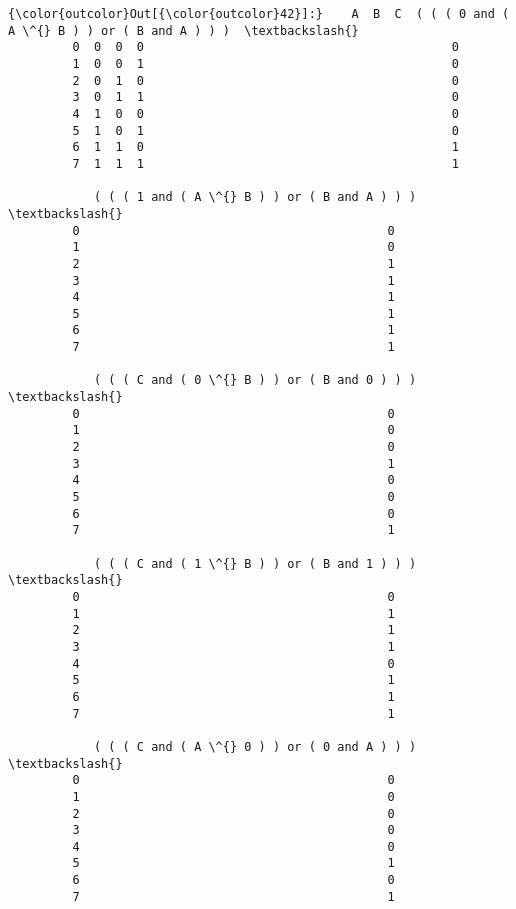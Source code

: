 \documentclass[11pt]{article}
\begin{document}
\begin{Verbatim}[commandchars=\\\{\}]
{\color{outcolor}Out[{\color{outcolor}42}]:}    A  B  C  ( ( ( 0 and ( A \^{} B ) ) or ( B and A ) ) )  \textbackslash{}
         0  0  0  0                                           0   
         1  0  0  1                                           0   
         2  0  1  0                                           0   
         3  0  1  1                                           0   
         4  1  0  0                                           0   
         5  1  0  1                                           0   
         6  1  1  0                                           1   
         7  1  1  1                                           1   
         
            ( ( ( 1 and ( A \^{} B ) ) or ( B and A ) ) )  \textbackslash{}
         0                                           0   
         1                                           0   
         2                                           1   
         3                                           1   
         4                                           1   
         5                                           1   
         6                                           1   
         7                                           1   
         
            ( ( ( C and ( 0 \^{} B ) ) or ( B and 0 ) ) )  \textbackslash{}
         0                                           0   
         1                                           0   
         2                                           0   
         3                                           1   
         4                                           0   
         5                                           0   
         6                                           0   
         7                                           1   
         
            ( ( ( C and ( 1 \^{} B ) ) or ( B and 1 ) ) )  \textbackslash{}
         0                                           0   
         1                                           1   
         2                                           1   
         3                                           1   
         4                                           0   
         5                                           1   
         6                                           1   
         7                                           1   
         
            ( ( ( C and ( A \^{} 0 ) ) or ( 0 and A ) ) )  \textbackslash{}
         0                                           0   
         1                                           0   
         2                                           0   
         3                                           0   
         4                                           0   
         5                                           1   
         6                                           0   
         7                                           1   
         

\end{Verbatim}
\end{document}
